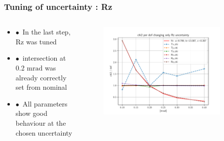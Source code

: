 \documentclass[aspectratio=1610, 12pt]{beamer}
\begin{document}
\begin{frame}\frametitle{Tuning of uncertainty : Rz}
  \begin{columns}
    \begin{column}[c]{0.4\textwidth}
      \begin{itemize}
        \item $\bullet$\, In the last step, Rz was tuned
        \item $\bullet$\, intersection at 0.2 $\text{mrad}$ was already correctly set from nominal
        \item $\bullet$\, All parameters show good behaviour at the chosen uncertainty
      \end{itemize}
    \end{column}
    \begin{column}[c]{0.6\textwidth}
      \begin{figure}
        \includegraphics[width=0.9\textwidth]{plots/retest/only_Rz_variable_full_fit.pdf}
      \end{figure}
    \end{column}
  \end{columns}
\end{frame}
\end{document}
